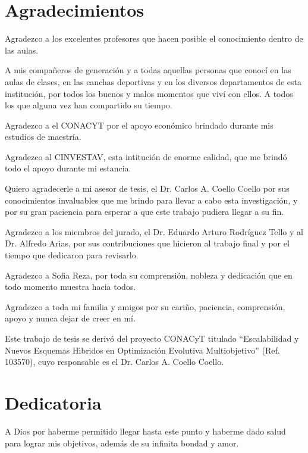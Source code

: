\chapter*{Agradecimientos}

Agradezco a los excelentes profesores que hacen posible el conocimiento dentro de las aulas.

A mis compa\~neros de generaci\'on y a todas aquellas personas que conoc\'i en las aulas de clases, en las canchas deportivas y en los diversos
departamentos de esta instituci\'on, por todos los buenos y malos momentos que viv\'i con ellos. A todos los que alguna vez han compartido su 
tiempo.

Agradezco a el CONACYT por el apoyo econ\'omico brindado durante mis estudios de maestr\'ia. 

Agradezco al CINVESTAV, esta intituci\'on de enorme calidad, que me brind\'o todo el apoyo durante mi estancia.

Quiero agradecerle a mi asesor de tesis, el Dr. Carlos A. Coello Coello por sus conocimientos invaluables que me brindo 
para llevar a cabo esta investigaci\'on, y por su gran paciencia para esperar a que este trabajo pudiera llegar a su fin.

Agradezco a los miembros del jurado, el Dr. Eduardo Arturo Rodr\'iguez Tello y al Dr. Alfredo Arias, por sus 
contribuciones que hicieron al trabajo final y por el tiempo que dedicaron para revisarlo.

Agradezco a Sofia Reza, por toda su comprensi\'on, nobleza y dedicaci\'on que en todo momento muestra hacia todos.

Agradezco a toda mi familia y amigos por su cari\~no, paciencia, comprensi\'on, apoyo y nunca dejar de creer en m\'i.

Este trabajo de tesis se deriv\'{o} del proyecto CONACyT titulado ``Escalabilidad y Nuevos Esquemas H\'{\i}bridos en Optimizaci\'{o}n
Evolutiva Multiobjetivo'' (Ref. 103570), cuyo responsable es el Dr. Carlos A. Coello Coello.


\chapter*{Dedicatoria}

A Dios por haberme permitido llegar hasta este punto y haberme dado salud para lograr mis objetivos, adem\'as de su infinita bondad y amor.

